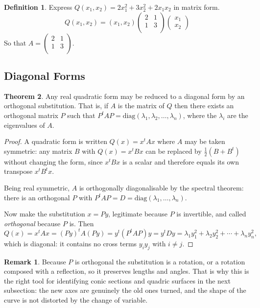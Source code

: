 \documentclass[11pt,a4paper]{article}
\theoremstyle{definition}
\newtheorem{thm}{Theorem}[subsection]
\newtheorem{defn}[thm]{Definition}
\newtheorem*{remark}{Remark}
\begin{document}
\begin{defn}
Express $Q(x_1,x_2)=2x^2_1+3x^2_2+2x_1x_2$ in matrix form.$$Q(x_1,x_2)=(x_1,x_2)
\begin{pmatrix}
2&1\\1&3\\
\end{pmatrix}
\begin{pmatrix}
x_1\\x_2
\end{pmatrix}
$$
So that $A=
\begin{pmatrix}
2&1\\1&3\\
\end{pmatrix}
$.


\pagebreak
\end{defn}
\subsection{Diagonal Forms}
\begin{thm}
Any real quadratic form may be reduced to a diagonal form by an orthogonal
substitution. That is, if $A$ is the matrix of $Q$ then there exists an
orthogonal matrix $P$ such that
$P^tAP=\text{diag}(\lambda_1,\lambda_2,\dots,\lambda_n)$, where the $\lambda_i$
are the eigenvalues of $A$.
\end{thm}

\begin{proof}
A quadratic form is written $Q(x)=x^tAx$ where $A$ may be taken symmetric: any
matrix $B$ with $Q(x)=x^tBx$ can be replaced by $\frac{1}{2}(B+B^t)$ without
changing the form, since $x^tBx$ is a scalar and therefore equals its own
transpose $x^tB^tx$.

Being real symmetric, $A$ is orthogonally diagonalisable by the spectral
theorem: there is an orthogonal $P$ with
$P^tAP=D=\text{diag}(\lambda_1,\dots,\lambda_n)$.

Now make the substitution $x=Py$, legitimate because $P$ is invertible, and
called \emph{orthogonal} because $P$ is. Then
$$Q(x)=x^tAx=(Py)^tA(Py)=y^t(P^tAP)y=y^tDy
=\lambda_1y_1^2+\lambda_2y_2^2+\cdots+\lambda_ny_n^2,$$
which is diagonal: it contains no cross terms $y_iy_j$ with $i\neq j$.
\end{proof}

\begin{remark}
Because $P$ is orthogonal the substitution is a rotation, or a rotation
composed with a reflection, so it preserves lengths and angles. That is why
this is the right tool for identifying conic sections and quadric surfaces in
the next subsection: the new axes are genuinely the old ones turned, and the
shape of the curve is not distorted by the change of variable.
\end{remark}
\end{document}
